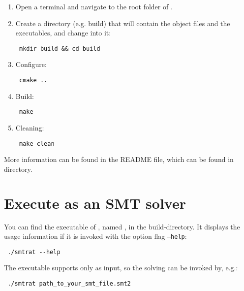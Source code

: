 \begin{enumerate}
	\item Open a terminal and navigate to the root folder of \smtrat.
	\item Create a directory (e.g. build) that will contain the object files and the executables, and change into it:
		\begin{verbatim} mkdir build && cd build\end{verbatim}
	\item Configure:
		\begin{verbatim} cmake .. \end{verbatim}
	\item Build: 
		\begin{verbatim} make \end{verbatim}
	\item Cleaning: 
		\begin{verbatim} make clean \end{verbatim}
\end{enumerate}

More information can be found in the README file, which can be found in \smtrat directory.

\section{Execute \smtrat as an SMT solver}
You can find the executable of \smtrat, named \smtratSolverName, in the build-directory. It displays the usage information if it is invoked with the option flag \texttt{--help}:
\begin{verbatim} ./smtrat --help\end{verbatim}
The executable supports only \smtlibFiles as input, so the solving can be invoked by, e.g.:
\begin{verbatim} ./smtrat path_to_your_smt_file.smt2\end{verbatim}

